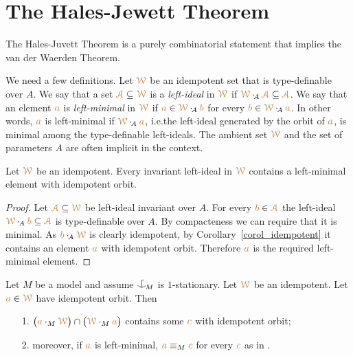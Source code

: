 \documentclass[creche.tex]{subfiles}
\begin{document}
\section{The Hales-Jewett Theorem}
\label{HJ}


The Hales-Juvett Theorem is a purely combinatorial statement 
that implies the van der Waerden Theorem.

We need a few definitions. 
Let ${\color{brown}\EuScript W}$ be an idempotent set that is type-definable over $A$.
We say that a set ${\color{brown}{\EuScript A}}\subseteq{\color{brown}\EuScript W}$ is a \emph{left-ideal\/} in ${\color{brown}\EuScript W}$ if ${\color{brown}\EuScript W}\cdot_{\!A}{\color{brown}{\EuScript A}}\subseteq{\color{brown}{\EuScript A}}$.
We say that an element ${\color{brown} a}$ is \emph{left-minimal\/} in ${\color{brown}\EuScript W}$ if 
${\color{brown} a}\in{\color{brown}\EuScript W}\cdot_{\!A}{\color{brown} b}$ for every ${\color{brown} b}\in{\color{brown}\EuScript W}\cdot_{\!A}{\color{brown} a}$.
In other words, ${\color{brown} a}$ is left-minimal 
if ${\color{brown}\EuScript W}\cdot_{\!A}{\color{brown} a}$, i.e.\@ the left-ideal generated by the orbit of ${\color{brown} a}$, is minimal among the type-definable left-ideals.
The ambient set ${\color{brown}\EuScript W}$ and the set of parameters $A$ are often implicit in the context.

\begin{proposition}\label{prop_minimal_existence1}
Let ${\color{brown}\EuScript W}$ be an idempotent. 
Every invariant left-ideal in ${\color{brown}\EuScript W}$ contains 
a left-minimal element with idempotent orbit.
\end{proposition}
\begin{proof}
Let ${\color{brown}{\EuScript A}}\subseteq{\color{brown}\EuScript W}$ be left-ideal invariant over $A$.
For every ${\color{brown} b}\in{\color{brown}{\EuScript A}}$ the left-ideal ${\color{brown}\EuScript W}\cdot_{\!A}{\color{brown} b}\subseteq{\color{brown}{\EuScript A}}$ is type-definable over $A$. 
By compacteness we can require that it is minimal. 
As ${\color{brown} b}\cdot_{\!A}{\color{brown}\EuScript W}$ is clearly idempotent, by Corollary~\ref{corol_idempotent} it contains an element ${\color{brown} a}$ with idempotent orbit. Therefore ${\color{brown} a}$ is the required left-minimal element.
\end{proof}

\begin{proposition}\label{prop_minimal_existence2}
Let $M$ be a model and assume $\nonforkc_{\!M}$ is $1$-stationary.
Let ${\color{brown}\EuScript W}$ be an idempotent. 
Let ${\color{brown} a}\in{\color{brown}\EuScript W}$ have idempotent orbit. 
Then 
\begin{itemize}
\item[1.] $\big({\color{brown} a}\cdot_M{\color{brown}\EuScript W}\big)\cap\big({\color{brown}\EuScript W}\cdot_M{\color{brown} a}\big)$ 
contains some ${\color{brown} c}$ with idempotent orbit;
\item[2.] moreover, if ${\color{brown} a}$ is left-minimal, ${\color{brown} a}\equiv_M{\color{brown} c}$ for every ${\color{brown} c}$ as in .
\end{itemize}
\end{proposition}
\end{document}
